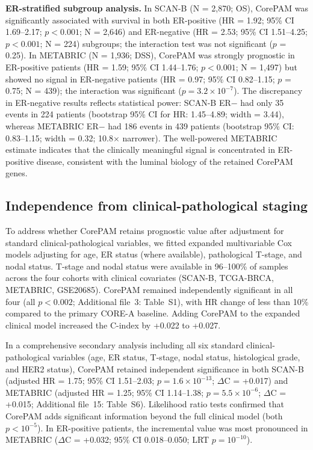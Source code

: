 \documentclass[referee,lineno,pdflatex,sn-vancouver-num]{sn-jnl}
\begin{document}
\textbf{ER-stratified subgroup analysis.} In SCAN-B (N = 2,870; OS), CorePAM was significantly associated with survival in both ER-positive (HR = 1.92; 95\% CI 1.69--2.17; $p < 0.001$; N = 2,646) and ER-negative (HR = 2.53; 95\% CI 1.51--4.25; $p < 0.001$; N = 224) subgroups; the interaction test was not significant ($p$ = 0.25). In METABRIC (N = 1,936; DSS), CorePAM was strongly prognostic in ER-positive patients (HR = 1.59; 95\% CI 1.44--1.76; $p < 0.001$; N = 1,497) but showed no signal in ER-negative patients (HR = 0.97; 95\% CI 0.82--1.15; $p$ = 0.75; N = 439); the interaction was significant ($p = 3.2 \times 10^{-7}$). The discrepancy in ER-negative results reflects statistical power: SCAN-B ER$-$ had only 35 events in 224 patients (bootstrap 95\% CI for HR: 1.45--4.89; width = 3.44), whereas METABRIC ER$-$ had 186 events in 439 patients (bootstrap 95\% CI: 0.83--1.15; width = 0.32; 10.8$\times$ narrower). The well-powered METABRIC estimate indicates that the clinically meaningful signal is concentrated in ER-positive disease, consistent with the luminal biology of the retained CorePAM genes.

\subsection{Independence from clinical-pathological staging}\label{subsec:results-staging}

To address whether CorePAM retains prognostic value after adjustment for standard clinical-pathological variables, we fitted expanded multivariable Cox models adjusting for age, ER status (where available), pathological T-stage, and nodal status. T-stage and nodal status were available in 96--100\% of samples across the four cohorts with clinical covariates (SCAN-B, TCGA-BRCA, METABRIC, GSE20685). CorePAM remained independently significant in all four (all $p < 0.002$; Additional file~3: Table~S1), with HR change of less than 10\% compared to the primary CORE-A baseline. Adding CorePAM to the expanded clinical model increased the C-index by +0.022 to +0.027.

In a comprehensive secondary analysis including all six standard clinical-pathological variables (age, ER status, T-stage, nodal status, histological grade, and HER2 status), CorePAM retained independent significance in both SCAN-B (adjusted HR = 1.75; 95\% CI 1.51--2.03; $p = 1.6 \times 10^{-13}$; $\Delta$C = +0.017) and METABRIC (adjusted HR = 1.25; 95\% CI 1.14--1.38; $p = 5.5 \times 10^{-6}$; $\Delta$C = +0.015; Additional file~15: Table~S6). Likelihood ratio tests confirmed that CorePAM adds significant information beyond the full clinical model (both $p < 10^{-5}$). In ER-positive patients, the incremental value was most pronounced in METABRIC ($\Delta$C = +0.032; 95\% CI 0.018--0.050; LRT $p = 10^{-10}$).
\end{document}
